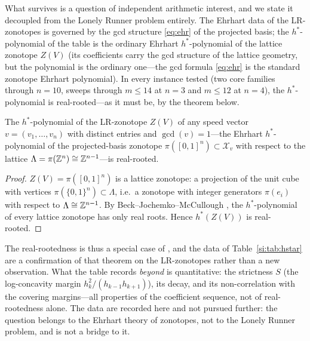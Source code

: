 What survives is a question of independent arithmetic interest, and we
state it decoupled from the Lonely Runner problem entirely. The
Ehrhart data of the LR-zonotopes is governed by the gcd structure
\eqref{eq:ehr} of the projected basis; the $h^*$-polynomial of the table
is the ordinary Ehrhart $h^*$-polynomial of the lattice zonotope $Z(V)$
(its coefficients carry the gcd structure of the lattice geometry, but
the polynomial is the ordinary one---the gcd formula \eqref{eq:ehr} is
the standard zonotope Ehrhart polynomial). In every instance tested (two
core families through $n=10$, sweeps through $m\le14$ at $n=3$ and
$m\le12$ at $n=4$), the $h^*$-polynomial is real-rooted---as it must be,
by the theorem below.

\begin{corollary}\label{si:cor:hstarRR}
The $h^*$-polynomial of the LR-zonotope $Z(V)$ of any speed vector
$v=(v_1,\dots,v_n)$ with distinct entries and $\gcd(v)=1$---the
Ehrhart $h^*$-polynomial of the projected-basis zonotope
$\pi([0,1]^n)\subset\mathcal{X}_v$ with respect to the lattice
$\Lambda=\pi(\mathbb{Z}^n)\cong\mathbb{Z}^{n-1}$---is real-rooted.
\end{corollary}

\begin{proof}
$Z(V)=\pi([0,1]^n)$ is a lattice zonotope: a projection of the unit cube
with vertices $\pi(\{0,1\}^n)\subset\Lambda$, i.e.\ a zonotope with
integer generators $\pi(e_i)$ with respect to $\Lambda\cong\mathbb{Z}^{n-1}$. By
Beck--Jochemko--McCullough \cite{BJM}, the $h^*$-polynomial of every
lattice zonotope has only real roots. Hence $h^*(Z(V))$ is real-rooted.
\end{proof}

The real-rootedness is thus a special case of \cite{BJM}, and the data
of Table~\ref{si:tab:hstar} are a confirmation of that theorem on the
LR-zonotopes rather than a new observation. What the table records
\emph{beyond} \cite{BJM} is quantitative: the strictness $S$ (the
log-concavity margin $h_k^2/(h_{k-1}h_{k+1})$), its decay, and its
non-correlation with the covering margins---all properties of the
coefficient sequence, not of real-rootedness alone. The data are recorded
here and not pursued further: the question belongs to the Ehrhart theory
of zonotopes, not to the Lonely Runner problem, and is not a bridge to
it.
